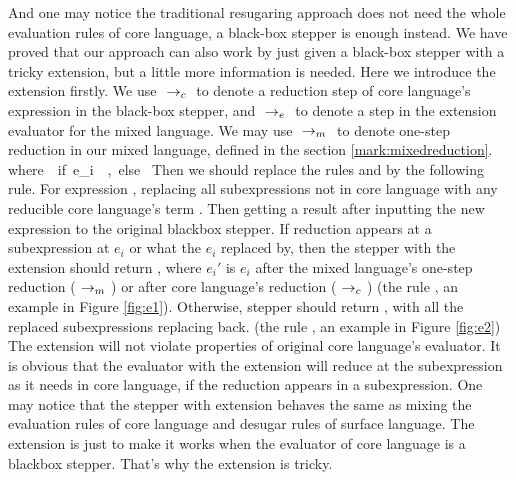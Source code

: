 \label{mark:blackbox}
And one may notice the traditional resugaring approach does not need the whole evaluation rules of core language, a black-box stepper is enough instead. We have proved that our approach can also work by just given a black-box stepper with a tricky extension, but a little more information is needed. Here we introduce the extension firstly.
We use $~\rightarrow_c~$ to denote a reduction step of core language's expression in the black-box stepper, and $~\rightarrow_e~$ to denote a step in the extension evaluator for the mixed language. We may use $~\rightarrow_m~$ to denote one-step reduction in our mixed language, defined in the section \ref{mark:mixedreduction}.
{}
{\\where~~if~e_i~\in~,~else~}
{}
Then we should replace the rules  and  by the following rule.
{}
For expression , replacing all subexpressions not in core language with any reducible core language's term . Then getting a result after inputting the new expression  to the original blackbox stepper. If reduction appears at a subexpression at $e_i$ or what the $e_i$ replaced by, then the stepper with the extension should return , where $e_i'$ is $e_i$ after the mixed language's one-step reduction ($~\rightarrow_m~$) or after core language's reduction ($~\rightarrow_c~$) (the rule , an example in Figure \ref{fig:e1}). Otherwise, stepper should return , with all the replaced subexpressions replacing back. (the rule , an example in Figure \ref{fig:e2}) The extension will not violate properties of original core language's evaluator. It is obvious that the evaluator with the extension will reduce at the subexpression as it needs in core language, if the reduction appears in a subexpression. One may notice that the stepper with extension behaves the same as mixing the evaluation rules of core language and desugar rules of surface language. The extension is just to make it works when the evaluator of core language is a blackbox stepper. That's why the extension is tricky.

